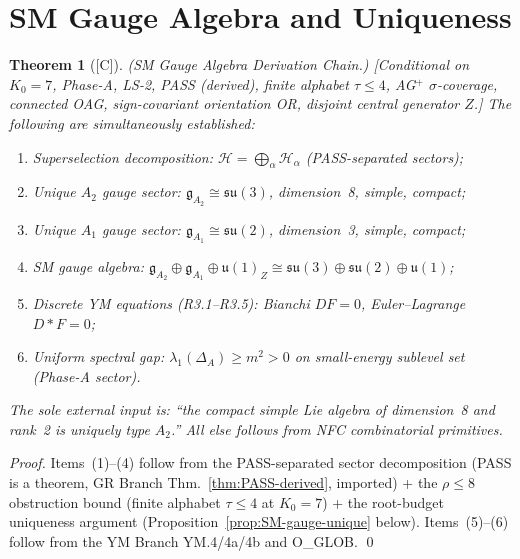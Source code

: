 \documentclass[12pt,oneside]{amsbook}
\theoremstyle{plain}
\newtheorem{theorem}{Theorem}[section]
\theoremstyle{definition}
\theoremstyle{remark}
\newcommand{\status}[1]{\textup{[#1]}}
\begin{document}
\section{SM Gauge Algebra and Uniqueness}
\label{sec:sm-gauge}

\begin{theorem}[\status{C}]\label{thm:SM-gauge-chain}
\textup{(SM Gauge Algebra Derivation Chain.)}
\textup{[Conditional on $K_0=7$, Phase-A, LS-2, PASS (derived),
finite alphabet $\tau \leq 4$, AG$^+$ $\sigma$-coverage,
connected OAG, sign-covariant orientation OR, disjoint central
generator $Z$.]}
The following are simultaneously established:
\begin{enumerate}[label=\textup{(\arabic*)}]
 \item \emph{Superselection decomposition}:
 $\mathcal{H} = \bigoplus_\alpha \mathcal{H}_\alpha$
 (PASS-separated sectors);
 \item \emph{Unique $A_2$ gauge sector}:
 $\mathfrak{g}_{A_2} \cong \mathfrak{su}(3)$,
 dimension~8, simple, compact;
 \item \emph{Unique $A_1$ gauge sector}:
 $\mathfrak{g}_{A_1} \cong \mathfrak{su}(2)$,
 dimension~3, simple, compact;
 \item \emph{SM gauge algebra}:
 $\mathfrak{g}_{A_2} \oplus \mathfrak{g}_{A_1}
 \oplus \mathfrak{u}(1)_Z
 \cong \mathfrak{su}(3)\oplus\mathfrak{su}(2)
 \oplus\mathfrak{u}(1)$;
 \item \emph{Discrete YM equations} (R3.1--R3.5):
 Bianchi $DF=0$, Euler--Lagrange $D{*}F=0$;
 \item \emph{Uniform spectral gap}:
 $\lambda_1(\Delta_A) \geq m^2 > 0$ on
 small-energy sublevel set (Phase-A sector).
\end{enumerate}
The sole external input is: ``the compact simple Lie algebra of
dimension~8 and rank~2 is uniquely type $A_2$.'' All else
follows from NFC combinatorial primitives.
\end{theorem}

\begin{proof}
Items~(1)--(4) follow from the PASS-separated sector decomposition
(PASS is a theorem, GR Branch Thm.~\ref{thm:PASS-derived},
imported) + the $\rho \leq 8$ obstruction bound (finite alphabet
$\tau \leq 4$ at $K_0 = 7$) + the root-budget uniqueness argument
(Proposition~\ref{prop:SM-gauge-unique} below). Items~(5)--(6)
follow from the YM Branch YM.4/4a/4b and O\_GLOB. \qed
\end{proof}
\end{document}
